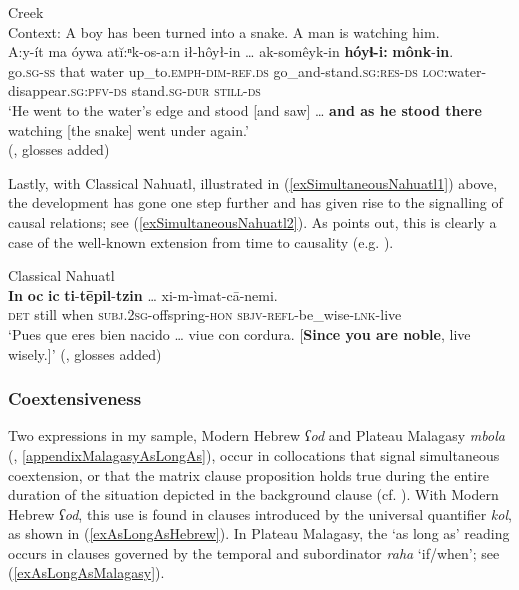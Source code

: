 \begin{exe}
	\ex Creek\label{exWhileCreek1}\\
	Context: A boy has been turned into a snake. A man is watching him.\\
	\gll A:y-ít ma óywa atĭ:ⁿk-os-a:n ił-hôył-in … ak-somêyk-in \textbf{hóyɬ-}\textbf{i:} \textbf{mônk}-\textbf{in}.\\
go.\textsc{sg}-\textsc{ss} that water up\_to.\textsc{emph}-\textsc{dim}-\textsc{ref}.\textsc{ds} go\_and-stand.\textsc{sg}:\textsc{res}-\textsc{ds} {} \textsc{loc}:water-disappear.\textsc{sg}:\textsc{pfv}-\textsc{ds} stand.\textsc{sg}-\textsc{dur} \textsc{still}-\textsc{ds}\\
\glt \lq He went to the water's edge and stood [and saw] … \textbf{and as he stood there} watching [the snake] went under again.'
\\(\cite[138]{HaasHill2014},  glosses added)
\end{exe}

Lastly, with Classical Nahuatl, illustrated in (\ref{exSimultaneousNahuatl1}) above, the development has gone one step further and has given rise to the signalling of causal relations; see (\ref{exSimultaneousNahuatl2}). As \textcite[1269]{Launey1986} points out, this is clearly a case of the well-known extension from time to causality (e.g. \cite[425]{KutevaEtAl2019}).

\begin{exe}
	\ex Classical Nahuatl\label{exSimultaneousNahuatl2}\\
		\gll \textbf{In} \textbf{oc} \textbf{ic} \textbf{ti}-\textbf{tēpil}-\textbf{tzin} … xi-m-ìmat-cā-nemi.\\
	\textsc{det} still when \textsc{subj}.2\textsc{sg}-offspring-\textsc{hon} {} \textsc{sbjv}-\textsc{refl}-be\_wise-\textsc{lnk}-live\\
		\glt \lq Pues que eres bien nacido … viue con cordura. [\textbf{Since you are noble}, live wisely.]' (\cite[503]{Carochi1645},  glosses added)
\end{exe}

\subsubsection{Coextensiveness}
\label{sectionAsLongAs}

Two expressions in my sample, Modern Hebrew \textit{ʕod} and Plateau Malagasy \textit{mbola} (, \ref{appendixMalagasyAsLongAs}), occur in collocations that signal simultaneous coextension, or that the matrix clause proposition holds true during the entire duration of the situation depicted in the background clause (cf. \cite[84]{Kortmann1997}). With Modern Hebrew \textit{ʕod}, this use is found in clauses introduced by the universal quantifier \textit{kol}, as shown in (\ref{exAsLongAsHebrew}). In Plateau Malagasy, the \lq as long as' reading occurs in clauses governed by the temporal and  subordinator \textit{raha} \lq if/when\rq{}; see (\ref{exAsLongAsMalagasy}).

